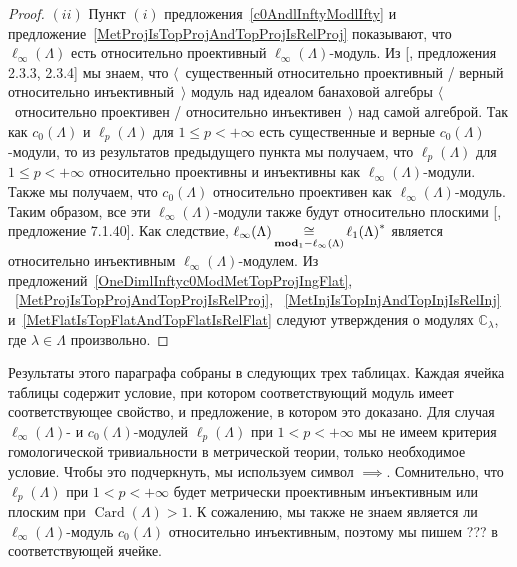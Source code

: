 \begin{proof}
$(ii)$ Пункт $(i)$ предложения~\ref{c0AndlInftyModlIfty} и
предложение~\ref{MetProjIsTopProjAndTopProjIsRelProj} показывают, что
$\ell_\infty(\Lambda)$ есть относительно проективный
$\ell_\infty(\Lambda)$-модуль. Из [\cite{RamsHomPropSemgroupAlg}, предложения
2.3.3, 2.3.4] мы знаем, что $\langle$~существенный относительно проективный /
верный относительно инъективный~$\rangle$ модуль над идеалом банаховой алгебры
$\langle$~относительно проективен / относительно инъективен~$\rangle$ над самой
алгеброй. Так как $c_0(\Lambda)$ и $\ell_p(\Lambda)$ для $1\leq p<+\infty$ есть
существенные и верные $c_0(\Lambda)$-модули, то из результатов предыдущего
пункта мы получаем, что $\ell_p(\Lambda)$ для $1\leq p<+\infty$ относительно
проективны и инъективны как $\ell_\infty(\Lambda)$-модули. Также мы получаем,
что $c_0(\Lambda)$ относительно проективен как $\ell_\infty(\Lambda)$-модуль.
Таким образом, все эти $\ell_\infty(\Lambda)$-модули также будут относительно
плоскими [\cite{HelBanLocConvAlg}, предложение 7.1.40]. Как следствие,
$\ell_\infty(\Lambda)
\mathop{\mathbin{\cong}}\limits_{\mathbf{mod}_1-\ell_\infty(\Lambda)}{\ell_1(\Lambda)}^*$
является относительно инъективным $\ell_\infty(\Lambda)$-модулем. Из
предложений~\ref{OneDimlInftyc0ModMetTopProjIngFlat},
~\ref{MetProjIsTopProjAndTopProjIsRelProj},
~\ref{MetInjIsTopInjAndTopInjIsRelInj}
и~\ref{MetFlatIsTopFlatAndTopFlatIsRelFlat} следуют утверждения о модулях
$\mathbb{C}_\lambda$,  где $\lambda\in\Lambda$ произвольно.
\end{proof}

Результаты этого параграфа собраны в следующих трех таблицах. Каждая ячейка
таблицы содержит условие, при котором соответствующий модуль имеет
соответствующее свойство, и предложение, в котором это доказано. Для случая
$\ell_\infty(\Lambda)$- и $c_0(\Lambda)$-модулей $\ell_p(\Lambda)$ при
$1<p<+\infty$ мы не имеем критерия гомологической тривиальности в метрической
теории, только необходимое условие. Чтобы это подчеркнуть, мы используем символ
$\implies$. Сомнительно, что $\ell_p(\Lambda)$ при $1<p<+\infty$ будет
метрически проективным инъективным или плоским при
$\operatorname{Card}(\Lambda)>1$. К сожалению, мы также не знаем является ли
$\ell_\infty(\Lambda)$-модуль $c_0(\Lambda)$ относительно инъективным, поэтому
мы пишем ??? в соответствующей ячейке.  %

